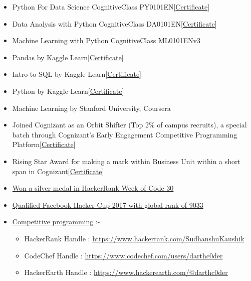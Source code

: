 \documentclass[10pt,a4paper,ragged2e]{altacv}
\begin{document}
\smallskip
\begin{itemize}
\item Python For Data Science CognitiveClass PY0101EN[\href{https://www.dropbox.com/s/iwxkw1sg1jnrsj3/Cognitiveclass\%20PY0101EN\%20Certificate\%20_\%20Cognitive\%20Class.pdf?dl=0}{Certificate}]
\item Data Analysis with Python CognitiveClass DA0101EN[\href{https://www.dropbox.com/s/w9udsb9ndrb8agj/CognitiveClass\%20DA0101EN\%20Certificate\%20_\%20Cognitive\%20Class.pdf?dl=0}{Certificate}]
\item Machine Learning with Python CognitiveClass ML0101ENv3
\item Pandas by Kaggle Learn[\href{https://www.dropbox.com/s/fb1hvlu12zobv00/SudhanshuKaushik\%20-\%20Pandas.png?dl=0}{Certificate}]
\item Intro to SQL by Kaggle Learn[\href{https://www.dropbox.com/s/5s1cn3cqyq16wqw/SudhanshuKaushik\%20-\%20Intro\%20to\%20SQL.png?dl=0}{Certificate}]
\item Python by Kaggle Learn[\href{https://www.dropbox.com/s/dsvbsbkx99rtvc1/SudhanshuKaushik\%20-\%20Python.png?dl=0}{Certificate}]
\item Machine Learning by Stanford University, Coursera
\end{itemize}

\smallskip
\begin{itemize}
\item Joined Cognizant as an Orbit Shifter (Top 2\% of campus recruits), a special batch through Cognizant’s Early Engagement          Competitive Programming Platform[\href{https://www.dropbox.com/s/46gp0t9b6dyp6zo/OrbitShifterCertf.pdf}{Certificate}]
\item Rising Star Award for making a mark within Business Unit within a short span in Cognizant[\href{https://www.dropbox.com/s/pp53covrsp5s2wu/RisingStarAward.pdf}{Certificate}]
\item \href{https://www.hackerrank.com/results/w30/SudhanshuKaushik}{Won a silver medal in HackerRank Week of Code 30}
\item \href{https://www.dropbox.com/s/pdbp1gtypb82c45/Gmail\%20-\%202017\%20Facebook\%20Hacker\%20Cup\%20Round\%201.pdf?dl=0}{Qualified Facebook Hacker Cup 2017 with global rank of 9033}
\item \href{https://www.stopstalk.com/user/profile/darthc0der}{Competitive programming} :-
\begin{itemize}
\item HackerRank Handle : \url{https://www.hackerrank.com/SudhanshuKaushik}
\item CodeChef Handle : \url{https://www.codechef.com/users/darthc0der}
\item HackerEarth Handle : \url{https://www.hackerearth.com/@darthc0der}
\end{itemize}
\end{itemize}

\clearpage

\nocite{*}
\end{document}
